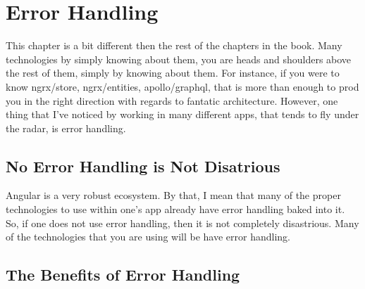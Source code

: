 \maketitle{}
\section{Error Handling}

This chapter is a bit different then the rest of the chapters in the book. Many
technologies by simply knowing about them, you are heads and shoulders above the
rest of them, simply by knowing about them. For instance, if you were to know
ngrx/store, ngrx/entities, apollo/graphql, that is more than enough to prod you
in the right direction with regards to fantatic architecture. However, one thing
that I've noticed by working in many different apps, that tends to fly under
the radar, is error handling.

\subsection{ No Error Handling is Not Disatrious }
Angular is a very robust ecosystem. By that, I mean that many of the proper
technologies to use within one's app already have error handling baked into it.
So, if one does not use error handling, then it is not completely disastrious.
Many of the technologies that you are using will be have error handling.

\subsection{ The Benefits of Error Handling }
